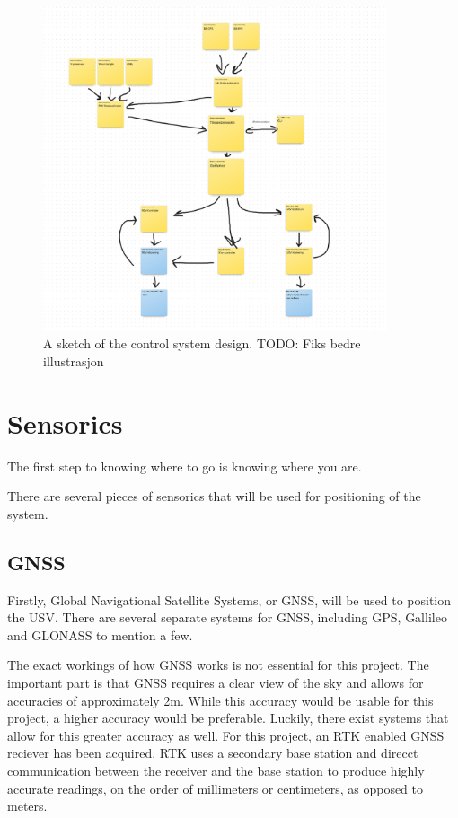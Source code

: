 \documentclass[class=article, crop=false, draft=true]{standalone}
\begin{document}
\begin{figure}
    \centering
    \includegraphics[width=0.9\textwidth]{control-system}
    \caption{A sketch of the control system design. TODO: Fiks bedre illustrasjon}
    \label{fig:control-system}
\end{figure}

\section{Sensorics}
The first step to knowing where to go is knowing where you are.

There are several pieces of sensorics that will be used for positioning of the system.

\subsection{GNSS}
Firstly, Global Navigational Satellite Systems, or GNSS, will be used to position the USV. There are several separate systems for GNSS, including GPS, Gallileo and GLONASS to mention a few.

The exact workings of how GNSS works is not essential for this project. The important part is that GNSS requires a clear view of the sky and allows for accuracies of approximately 2m. While this accuracy would be usable for this project, a higher accuracy would be preferable. Luckily, there exist systems that allow for this greater accuracy as well. For this project, an RTK enabled GNSS reciever has been acquired. RTK uses a secondary base station and direcct communication between the receiver and the base station to produce highly accurate readings, on the order of millimeters or centimeters, as opposed to meters.
\end{document}
